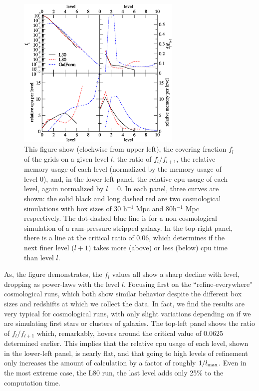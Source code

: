 \begin{figure}
\centerline{\includegraphics[width=0.7\textwidth]{figures/scaling_plot2}}
\caption{This figure show (clockwise from upper left), the covering fraction $f_l$ of the grids on a given level $l$, the ratio of $f_{l}/f_{l+1}$, the relative memory usage of each level (normalized by the memory usage of level 0), and, in the lower-left panel, the relative cpu usage of each level, again normalized by $l=0$.  In each panel, three curves are shown: the solid black and long dashed red are two cosmological simulations with box sizes of 30 h$^{-1}$ Mpc and 80h$^{-1}$ Mpc respectively.  The dot-dashed blue line is for a non-cosmological simulation of a ram-pressure stripped galaxy.  In the top-right panel, there is a line at the critical ratio of 0.06, which determines if the next finer level ($l+1)$ takes more (above) or less (below) cpu time than level $l$.}
\label{fig:scaling}
\end{figure}

As, the figure demonstrates, the $f_l$ values all show a sharp decline with level, dropping as power-laws with the level $l$.  Focusing first on the ``refine-everywhere" cosmological runs, which both show similar behavior despite the different box sizes and redshifts at which we collect the data.  In fact, we find the results are very typical for cosmological runs, with only slight variations depending on if we are simulating first stars or clusters of galaxies.  The top-left panel shows the ratio of $f_{l}/f_{l+1}$ which, remarkably, hovers around the critical value of 0.0625 determined earlier.  This implies that the relative cpu usage of each level, shown in the lower-left panel, is nearly flat, and that going to high levels of refinement only increases the amount of calculation by a factor of roughly $1/l_{\rm max}$.  Even in the most extreme case, the L80 run, the last level adds only 25\% to the computation time.

